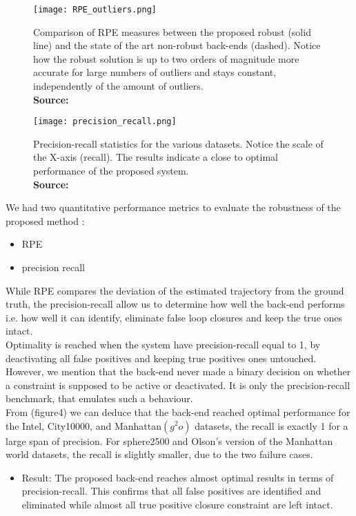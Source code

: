 \documentclass[9pt,technote]{IEEEtran}
\newcommand*{\captionsource}[2]{%
  \caption[{#1}]{%
    #1%
    \\\hspace{\linewidth}%
    \textbf{Source:} #2%
  }%
}
\begin{document}
\begin{figure}
[h!]
\centering
\texttt{[image: RPE\_outliers.png]}
\captionsource{Comparison of RPE measures between the proposed robust (solid line) and the state of the art non-robust back-ends (dashed).
Notice how the robust solution is up to two orders of magnitude more  accurate  for large  numbers  of  outliers  and  stays  constant, independently of the amount of outliers.}{\cite{sunderhauf2012switchable}}

\end{figure}
\begin{figure}
[h!]
\centering
\texttt{[image: precision\_recall.png]}
\captionsource{Precision-recall statistics for the various datasets. Notice the scale of the X-axis (recall). The results indicate a close to optimal performance of the proposed system.}{\cite{sunderhauf2012switchable}}
\end{figure}
We had two quantitative performance metrics to evaluate the robustness of the proposed method : 
\begin{itemize}
\item RPE 
\item precision recall
\end{itemize}
While RPE compares the deviation of the estimated trajectory from the ground truth, the precision-recall allow us to determine how well the back-end performs i.e. how well it can identify, eliminate false loop closures and keep the true ones intact.\\ 
Optimality is reached when the system have precision-recall equal to 1, by deactivating all false positives and keeping true positives ones untouched. 
However, we mention that the back-end never made a binary decision on whether a constraint is supposed to be active or deactivated. It is only the precision-recall benchmark, that emulates such a behaviour. 
\\ From (figure4) we can deduce that the back-end reached optimal performance for the Intel, City10000, and Manhattan$( g^2{o})$ datasets, the recall is exactly 1 for a large span of precision. For sphere2500 and Olson’s version of the Manhattan world datasets, the recall is slightly smaller, due to the two failure cases.
\begin{itemize}
\item Result: The proposed back-end reaches almost optimal results in terms of precision-recall. This confirms that all false positives are identified and eliminated while almost all true positive closure constraint are left intact.
\end{itemize} 
\end{document}
